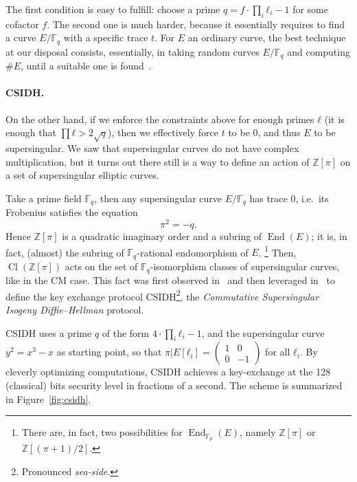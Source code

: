 \documentclass[10pt]{article}
\theoremstyle{plain}
\theoremstyle{definition}
\DeclareMathOperator{\End}{End} %
\DeclareMathOperator{\Cl}{Cl}
\def\F{\ensuremath{\mathbb{F}}}
\def\mat#1{\left(\begin{smallmatrix}#1\end{smallmatrix}\right)}
\begin{document}
The first condition is easy to fulfill: choose a prime
$q=f·\prod_i ℓ_i - 1$ for some cofactor $f$. %
The second one is much harder, because it essentially requires to find
a curve $E/\F_q$ with a specific trace $t$. %
For $E$ an ordinary curve, the best technique at our disposal
consists, essentially, in taking random curves $E/\F_q$ and computing
$\#E$, until a suitable one is found~\cite{AC:DeFKieSmi18}.

\paragraph{CSIDH.}
On the other hand, if we enforce the constraints above for enough
primes $ℓ$ (it is enough that $\prod ℓ>2\sqrt{q}$), then we
effectively force $t$ to be $0$, and thus $E$ to be supersingular. %
We saw that supersingular curves do not have complex multiplication,
but it turns out there still is a way to define an action of $ℤ[π]$ on
a set of supersingular elliptic curves.

Take a prime field $\F_q$, then any supersingular curve $E/\F_q$ has
trace $0$, i.e.\ its Frobenius satisfies the equation
\[π^2 = -q.\] %
Hence $ℤ[π]$ is a quadratic imaginary order and a subring of
$\End(E)$; it is, in fact, (almost) the subring of $\F_q$-rational
endomorphism of $E$.%
\footnote{There are, in fact, two possibilities for $\End_{\F_p}(E)$,
  namely $ℤ[π]$ or $ℤ[(π+1)/2]$.} %
Then, $\Cl(ℤ[π])$ acts on the set of $\F_q$-isomorphism classes of
supersingular curves, like in the CM case. %
This fact was first observed in~\cite{Delfs2016} and then leveraged
in~\cite{AC:CLMPR18} to define the key exchange protocol
CSIDH\footnote{Pronounced \emph{sea-side}.}, the \emph{Commutative
  Supersingular Isogeny Diffie--Hellman} protocol.

CSIDH uses a prime $q$ of the form $4·\prod_iℓ_i-1$, and the
supersingular curve $y^2 = x^3 - x$ as starting point, so that
$π|E[ℓ_i]=\mat{1&0\\0&-1}$ for all $ℓ_i$. %
By cleverly optimizing computations, CSIDH achieves a key-exchange at
the 128 (classical) bits security level in fractions of a second. %
The scheme is summarized in Figure~\ref{fig:csidh}.
\end{document}
